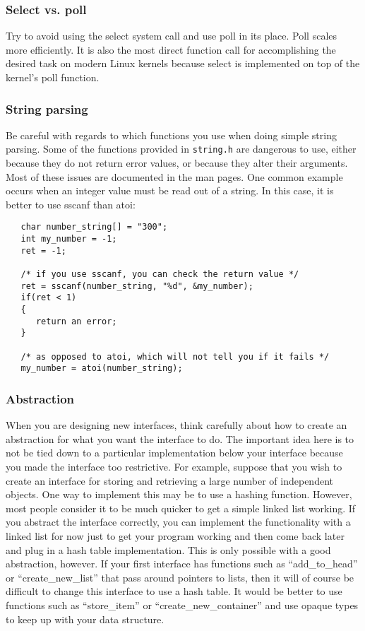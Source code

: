 \documentclass[11pt, letterpaper]{article}
\begin{document}
\subsubsection{Select vs. poll}

Try to avoid using the select system call and use poll in its place.
Poll scales more efficiently.  It is also the most direct function call
for accomplishing the desired task on modern Linux kernels because
select is implemented on top of the kernel's poll function.

\subsubsection{String parsing}

Be careful with regards to which functions you use when doing simple string parsing.
Some of the functions provided in {\tt string.h} are dangerous to use, either
because they do not return error values, or because they alter their
arguments.  Most of these issues are documented in the man pages.  One
common example occurs when an integer value must be read out of a
string.  In this case, it is better to use sscanf than atoi:

\begin{verbatim}
   char number_string[] = "300";
   int my_number = -1;
   ret = -1;

   /* if you use sscanf, you can check the return value */
   ret = sscanf(number_string, "%d", &my_number);
   if(ret < 1)
   {
      return an error;
   }

   /* as opposed to atoi, which will not tell you if it fails */
   my_number = atoi(number_string);
\end{verbatim}

\subsubsection{Abstraction}

When you are designing new interfaces, think carefully about how to
create an abstraction for what you want the interface to do.  The important idea
here is to not be tied down to a particular implementation below your
interface because you made the interface too restrictive.  For example, suppose that you wish to create an interface for
storing and retrieving a large number of independent objects.  One way
to implement this may be to use a hashing function.  However, most
people consider it to be much quicker to get a simple linked list
working.  If you abstract the interface correctly, you can implement the
functionality with a linked list for now just to get your program
working and then come back later and plug in a hash table
implementation.  This is only possible with a good abstraction, however.
If your first interface has functions such as ``add\_to\_head'' or
``create\_new\_list'' that pass around pointers to lists, then it will of
course be difficult to change this interface to use a hash table.  It
would be better to use functions such as ``store\_item'' or
``create\_new\_container'' and use opaque types to keep up with your data
structure.
\end{document}
